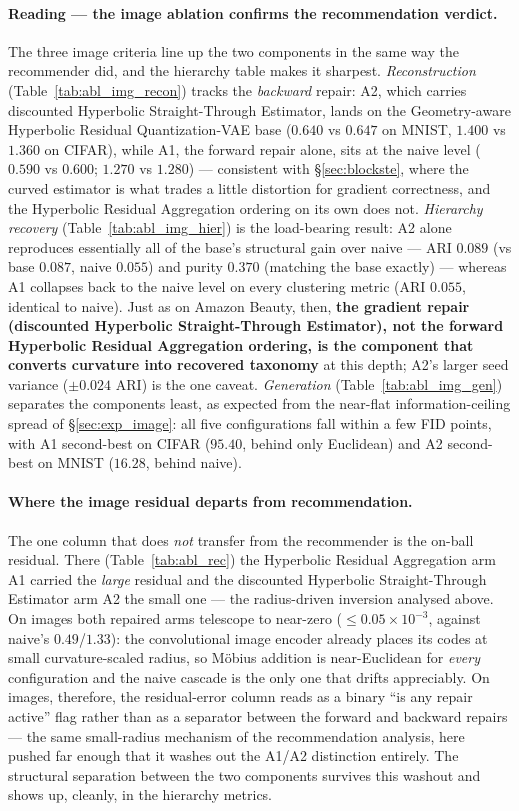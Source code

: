 \documentclass[12pt]{report}
\begin{document}
\paragraph{Reading --- the image ablation confirms the recommendation verdict.} The three image criteria line up the two components in the same way the recommender did, and the hierarchy table makes it sharpest. \emph{Reconstruction} (Table~\ref{tab:abl_img_recon}) tracks the \emph{backward} repair: A2, which carries discounted Hyperbolic Straight-Through Estimator, lands on the Geometry-aware Hyperbolic Residual Quantization-VAE base ($0.640$ vs $0.647$ on MNIST, $1.400$ vs $1.360$ on CIFAR), while A1, the forward repair alone, sits at the naive level ($0.590$ vs $0.600$; $1.270$ vs $1.280$) --- consistent with \S\ref{sec:blockste}, where the curved estimator is what trades a little distortion for gradient correctness, and the Hyperbolic Residual Aggregation ordering on its own does not. \emph{Hierarchy recovery} (Table~\ref{tab:abl_img_hier}) is the load-bearing result: A2 alone reproduces essentially all of the base's structural gain over naive --- ARI $0.089$ (vs base $0.087$, naive $0.055$) and purity $0.370$ (matching the base exactly) --- whereas A1 collapses back to the naive level on every clustering metric (ARI $0.055$, identical to naive). Just as on Amazon Beauty, then, \textbf{the gradient repair (discounted Hyperbolic Straight-Through Estimator), not the forward Hyperbolic Residual Aggregation ordering, is the component that converts curvature into recovered taxonomy} at this depth; A2's larger seed variance ($\pm0.024$ ARI) is the one caveat. \emph{Generation} (Table~\ref{tab:abl_img_gen}) separates the components least, as expected from the near-flat information-ceiling spread of \S\ref{sec:exp_image}: all five configurations fall within a few FID points, with A1 second-best on CIFAR ($95.40$, behind only Euclidean) and A2 second-best on MNIST ($16.28$, behind naive).

\paragraph{Where the image residual departs from recommendation.} The one column that does \emph{not} transfer from the recommender is the on-ball residual. There (Table~\ref{tab:abl_rec}) the Hyperbolic Residual Aggregation arm A1 carried the \emph{large} residual and the discounted Hyperbolic Straight-Through Estimator arm A2 the small one --- the radius-driven inversion analysed above. On images both repaired arms telescope to near-zero ($\le 0.05\times10^{-3}$, against naive's $0.49$/$1.33$): the convolutional image encoder already places its codes at small curvature-scaled radius, so M\"obius addition is near-Euclidean for \emph{every} configuration and the naive cascade is the only one that drifts appreciably. On images, therefore, the residual-error column reads as a binary ``is any repair active'' flag rather than as a separator between the forward and backward repairs --- the same small-radius mechanism of the recommendation analysis, here pushed far enough that it washes out the A1/A2 distinction entirely. The structural separation between the two components survives this washout and shows up, cleanly, in the hierarchy metrics.
\end{document}
